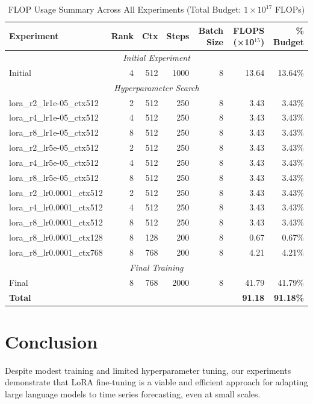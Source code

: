 \documentclass[11pt]{article}
\begin{document}
\begin{table}[htbp]
\centering
\caption{FLOP Usage Summary Across All Experiments (Total Budget: $1 \times 10^{17}$ FLOPs)}
\begin{tabular}{lrrrrrr}
\hline
\textbf{Experiment} & \textbf{Rank} & \textbf{Ctx} & \textbf{Steps} & \textbf{Batch Size} & \textbf{FLOPS (×10$^{15}$)} & \textbf{\% Budget} \\
\hline
\multicolumn{7}{c}{\textit{Initial Experiment}} \\
\hline
Initial & 4 & 512 & 1000 & 8 & 13.64 & 13.64\% \\
\hline
\multicolumn{7}{c}{\textit{Hyperparameter Search}} \\
\hline
lora\_r2\_lr1e-05\_ctx512 & 2 & 512 & 250 & 8 & 3.43 & 3.43\% \\
lora\_r4\_lr1e-05\_ctx512 & 4 & 512 & 250 & 8 & 3.43 & 3.43\% \\
lora\_r8\_lr1e-05\_ctx512 & 8 & 512 & 250 & 8 & 3.43 & 3.43\% \\
lora\_r2\_lr5e-05\_ctx512 & 2 & 512 & 250 & 8 & 3.43 & 3.43\% \\
lora\_r4\_lr5e-05\_ctx512 & 4 & 512 & 250 & 8 & 3.43 & 3.43\% \\
lora\_r8\_lr5e-05\_ctx512 & 8 & 512 & 250 & 8 & 3.43 & 3.43\% \\
lora\_r2\_lr0.0001\_ctx512 & 2 & 512 & 250 & 8 & 3.43 & 3.43\% \\
lora\_r4\_lr0.0001\_ctx512 & 4 & 512 & 250 & 8 & 3.43 & 3.43\% \\
lora\_r8\_lr0.0001\_ctx512 & 8 & 512 & 250 & 8 & 3.43 & 3.43\% \\
lora\_r8\_lr0.0001\_ctx128 & 8 & 128 & 200 & 8 & 0.67 & 0.67\% \\
lora\_r8\_lr0.0001\_ctx768 & 8 & 768 & 200 & 8 & 4.21 & 4.21\% \\
\hline
\multicolumn{7}{c}{\textit{Final Training}} \\
\hline
Final & 8 & 768 & 2000 & 8 & 41.79 & 41.79\% \\
\hline
\textbf{Total} & & & & & \textbf{91.18} & \textbf{91.18\%} \\
\hline
\end{tabular}
\label{tab:flop_sum}
\end{table}


\section{Conclusion}

Despite modest training and limited hyperparameter tuning, our experiments demonstrate that LoRA fine-tuning is a viable and efficient approach for adapting large language models to time series forecasting, even at small scales.
\end{document}
